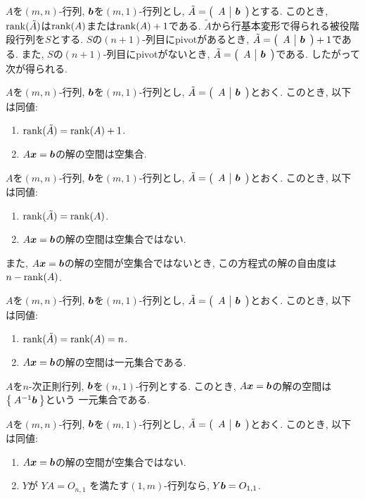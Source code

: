 $A$を$(m,n)$-行列, $\boldsymbol{b}$を$(m,1)$-行列とし,
$\tilde A=\left(\begin{array}{c|c}A& \boldsymbol{b}\end{array}\right)$とする.
このとき,
$\operatorname{rank}(\tilde A)$は$\operatorname{rank}(A)$または$\operatorname{rank}(A)+1$である.
$\tilde A$から行基本変形で得られる被役階段行列を$S$とする.
$S$の$(n+1)$-列目にpivotがあるとき,
$\tilde A=\left(\begin{array}{c|c}A& \boldsymbol{b}\end{array}\right)+1$である.
また,
$S$の$(n+1)$-列目にpivotがないとき,
$\tilde A=\left(\begin{array}{c|c}A& \boldsymbol{b}\end{array}\right)$である.
したがって次が得られる.
\begin{theorem}
  $A$を$(m,n)$-行列, $\boldsymbol{b}$を$(m,1)$-行列とし,
  $\tilde A=\left(\begin{array}{c|c}A& \boldsymbol{b}\end{array}\right)$とおく.
  このとき, 以下は同値:
  \begin{enumerate}
  \item $\operatorname{rank}(\tilde A)=\operatorname{rank}(A)+1$.
  \item $A\boldsymbol{x}=\boldsymbol{b}$の解の空間は空集合.
  \end{enumerate} 
\end{theorem}
\begin{theorem}
  $A$を$(m,n)$-行列, $\boldsymbol{b}$を$(m,1)$-行列とし,
  $\tilde A=\left(\begin{array}{c|c}A& \boldsymbol{b}\end{array}\right)$とおく.
  このとき, 以下は同値:
  \begin{enumerate}
  \item $\operatorname{rank}(\tilde A)=\operatorname{rank}(A)$.
  \item $A\boldsymbol{x}=\boldsymbol{b}$の解の空間は空集合ではない.
  \end{enumerate}
  また,
  $A\boldsymbol{x}=\boldsymbol{b}$の解の空間が空集合ではないとき,
  この方程式の解の自由度は$n-\operatorname{rank}(A)$.
\end{theorem}

\begin{cor}
  $A$を$(m,n)$-行列, $\boldsymbol{b}$を$(m,1)$-行列とし,
  $\tilde A=\left(\begin{array}{c|c}A& \boldsymbol{b}\end{array}\right)$とおく.
  このとき, 以下は同値:
  \begin{enumerate}
  \item $\operatorname{rank}(\tilde A)=\operatorname{rank}(A)=n$.
  \item $A\boldsymbol{x}=\boldsymbol{b}$の解の空間は一元集合である.
  \end{enumerate}
\end{cor}


\begin{cor}
  $A$を$n$-次正則行列, $\boldsymbol{b}$を$(n,1)$-行列とする.
  このとき, $A\boldsymbol{x}=\boldsymbol{b}$の解の空間は$\Set{A^{-1}\boldsymbol{b}}$という
  一元集合である.
\end{cor}

\begin{theorem}
  $A$を$(m,n)$-行列, $\boldsymbol{b}$を$(m,1)$-行列とし,
  $\tilde A=\left(\begin{array}{c|c}A& \boldsymbol{b}\end{array}\right)$とおく.
  このとき, 以下は同値:
  \begin{enumerate}
  \item
    \label{thm:ortho:eq:item:sol}
    $A\boldsymbol{x}=\boldsymbol{b}$の解の空間が空集合ではない.
  \item
    \label{thm:ortho:eq:item:ortho}
    $Y$が
    $YA=O_{n,1}$
    を満たす$(1,m)$-行列なら,
    $Y\boldsymbol{b}=O_{1,1}$.
  \end{enumerate}  
\end{theorem}

